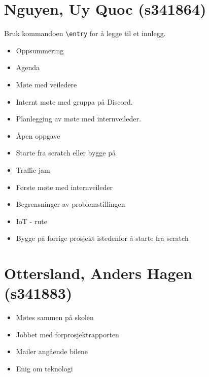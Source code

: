 
\part*{Nguyen, Uy Quoc (s341864)}
\markright{}
Bruk kommandoen \lstinline{\entry} for å legge til et innlegg.

\begin{itemize}
	\item Oppsummering
	\item Agenda
	\item Møte med veiledere
	\item Internt møte med gruppa på Discord.
	\item Planlegging av møte med internveileder.
	\item Åpen oppgave
	\item Starte fra scratch eller bygge på
	\item Traffic jam
\end{itemize}

\begin{itemize}
	\item Første møte med internveileder
	\item Begrensninger av problemstillingen
	\item IoT - rute
	\item Bygge på forrige prosjekt istedenfor å starte fra scratch
\end{itemize}

\part{Ottersland, Anders Hagen (s341883)}

\begin{itemize}
	\item Møtes sammen på skolen
	\item Jobbet med forprosjektrapporten
	\item Mailer angående bilene
	\item Enig om teknologi
\end{itemize}


